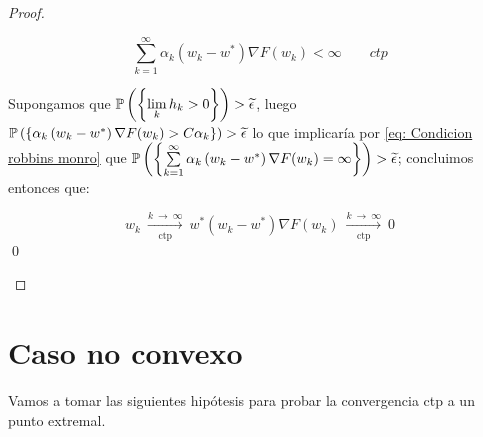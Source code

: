 \begin{proof}
\begin{enumerate}
		\begin{equation*}
		\sum\limits_{k=1}^{\infty} {\alpha_k \left(w_k - w^* \right)\nabla F(w_k)} < \infty \qquad ctp
		\end{equation*}
		
		Supongamos que $\mathbb{P}\left(\left\lbrace\lim\limits_{k} {h_k} > 0\right\rbrace\right) > \widetilde{\epsilon}$, luego $\mathbb{P}\left(\left\lbrace\alpha_k \left(w_k - w^* \right)\nabla F(w_k) > C\alpha_k\right\rbrace\right) > \widetilde{\epsilon}$ lo que implicar\'ia por \ref{eq: Condicion robbins monro} que $\mathbb{P}\left(\left\lbrace\sum\limits_{k=1}^{\infty} {\alpha_k \left(w_k - w^* \right)\nabla F(w_k)} = \infty\right\rbrace\right) > \widetilde{\epsilon}$; concluimos entonces que:
		
			\begin{subequations}
			\begin{equation}
			w_k \ \xrightarrow[\text{ctp}]{k \ \rightarrow \ \infty } \ w^*
			\end{equation}
			\begin{equation}
			\left(w_k - w^*\right) \nabla F(w_k) \ \xrightarrow[\text{ctp}]{k \ \rightarrow \ \infty } \ 0
			\end{equation}
		\end{subequations}\qed
		
	\end{enumerate}
	
\end{proof}

\section{Caso no convexo}

Vamos a tomar las siguientes hip\'otesis para probar la convergencia ctp a un punto extremal.

